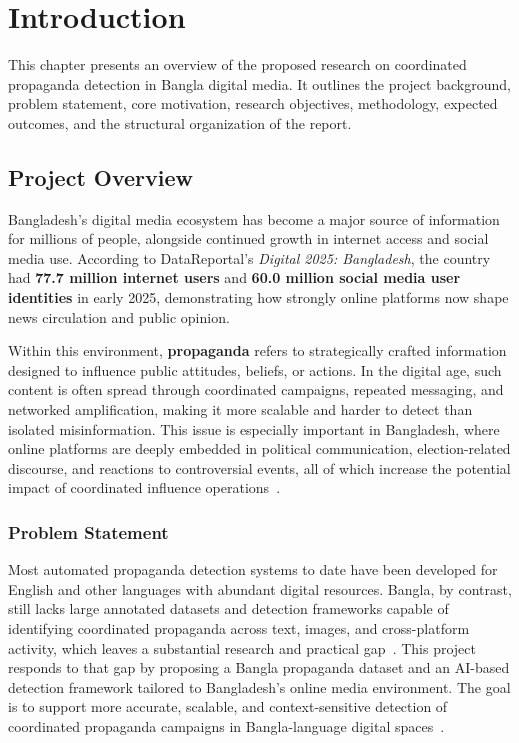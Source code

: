 \chapter{Introduction}
\label{ch:intro}

This chapter presents an overview of the proposed research on coordinated
propaganda detection in Bangla digital media. It outlines the project background,
problem statement, core motivation, research objectives, methodology, expected
outcomes, and the structural organization of the report.

\section{Project Overview}
Bangladesh's digital media ecosystem has become a major source of information for
millions of people, alongside continued growth in internet access and social media
use. According to DataReportal's \emph{Digital 2025: Bangladesh}, the country had
\textbf{77.7 million internet users} and \textbf{60.0 million social media user
identities} in early 2025, demonstrating how strongly online platforms now shape
news circulation and public opinion.

Within this environment, \textbf{propaganda} refers to strategically crafted
information designed to influence public attitudes, beliefs, or actions. In the
digital age, such content is often spread through coordinated campaigns, repeated
messaging, and networked amplification, making it more scalable and harder to
detect than isolated misinformation. This issue is especially important in
Bangladesh, where online platforms are deeply embedded in political communication,
election-related discourse, and reactions to controversial events, all of which
increase the potential impact of coordinated influence operations~\cite{hristakieva2022}.

\subsection*{Problem Statement}
Most automated propaganda detection systems to date have been developed for English
and other languages with abundant digital resources. Bangla, by contrast, still
lacks large annotated datasets and detection frameworks capable of identifying
coordinated propaganda across text, images, and cross-platform activity, which
leaves a substantial research and practical gap~\cite{hossain2020}. This project
responds to that gap by proposing a Bangla propaganda dataset and an AI-based
detection framework tailored to Bangladesh's online media environment. The goal is
to support more accurate, scalable, and context-sensitive detection of coordinated
propaganda campaigns in Bangla-language digital spaces~\cite{hossain2020,kamruzzaman2023}.

